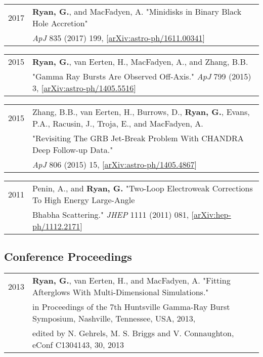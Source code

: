 \documentclass[letterpaper]{article}
\renewenvironment{itemize}{
  \begin{list}{}{
    \setlength{\leftmargin}{1.5em}
  }
}{
  \end{list}
}
\begin{document}
\begin{itemize}
\item \begin{tabular}{ll}
2017 & {\bf Ryan, G.}, and MacFadyen, A. "Minidisks in Binary Black Hole Accretion" \\ 
	& \emph{ApJ} 835 (2017) 199, [\href{https://arxiv.org/abs/1611.00341}{arXiv:astro-ph/1611.00341}]
\end{tabular}

\item \begin{tabular}{ll}
2015 & {\bf Ryan, G.}, van Eerten, H., MacFadyen, A., and Zhang, B.B. \\ 
	& "Gamma Ray Bursts Are Observed Off-Axis."  \emph{ApJ} 799 (2015) 3, [\href{https://arxiv.org/abs/1405.5516}{arXiv:astro-ph/1405.5516}] \\
\end{tabular}

\item \begin{tabular}{ll}
2015 & Zhang, B.B., van Eerten, H., Burrows, D., {\bf Ryan, G.}, {Evans}, P.A., Racusin, J., Troja, E., and MacFadyen, A. \\
 & "Revisiting The GRB Jet-Break Problem With CHANDRA Deep Follow-up Data."  \\
&  \emph{ApJ} 806 (2015) 15, [\href{https://arxiv.org/abs/1405.4867}{arXiv:astro-ph/1405.4867}] \\
\end{tabular}

\item \begin{tabular}{ll}
2011 & Penin, A., and {\bf Ryan, G.}  "Two-Loop Electroweak Corrections To High Energy Large-Angle \\& Bhabha Scattering." \emph{JHEP} 1111 (2011) 081, [\href{https://arxiv.org/abs/1112.2171}{arXiv:hep-ph/1112.2171}] \\
\end{tabular}
\end{itemize}

\subsection*{Conference Proceedings}
\begin{itemize}
\item \begin{tabular}{ll}
2013 & {\bf Ryan, G.}, van Eerten, H., and MacFadyen, A. "Fitting Afterglows With Multi-Dimensional Simulations." \\& in Proceedings of the 7th Huntsville Gamma-Ray Burst Symposium, Nashville, Tennessee, USA, 2013, \\& edited by N. Gehrels, M. S. Briggs and V. Connaughton, eConf C1304143, 30, 2013 \\
\end{tabular}
\end{itemize}
\end{document}
